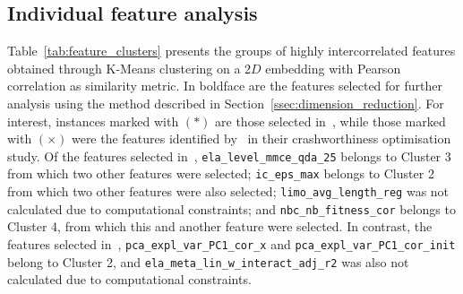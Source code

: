 \documentclass[acmsmall,screen,review,anonymous]{acmart}
\begin{document}
\subsection{Individual feature analysis}
Table~\ref{tab:feature_clusters} presents the groups of highly intercorrelated features obtained through K-Means clustering on a 2$D$ embedding with Pearson correlation as similarity metric. In boldface are the features selected for further analysis using the method described in Section~\ref{ssec:dimension_reduction}. For interest, instances marked with $\left(*\right)$ are those selected in~\cite{Malan2025}, while those marked with $\left(\times\right)$ were the features identified by~\citet{Long2022} in their crashworthiness optimisation study. Of the features selected in~\cite{Malan2025}, {\tt ela\_level\_mmce\_qda\_25} belongs to Cluster 3 from which two other features were selected; {\tt ic\_eps\_max} belongs to Cluster 2 from which two other features were also selected; {\tt limo\_avg\_length\_reg} was not calculated due to computational constraints; and {\tt nbc\_nb\_fitness\_cor} belongs to Cluster 4, from which this and another feature were selected. In contrast, the features selected in~\cite{Long2022}, {\tt pca\_expl\_var\_PC1\_cor\_x} and {\tt pca\_expl\_var\_PC1\_cor\_init} belong to Cluster 2, and {\tt ela\_meta\_lin\_w\_interact\_adj\_r2} was also not calculated due to computational constraints.
\end{document}
